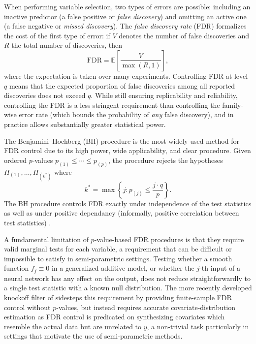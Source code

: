 When performing variable selection, two types of errors are
possible: 
including an inactive predictor (a false positive or \emph{false discovery}) 
and omitting an active one (a false negative or \emph{missed discovery}).
The \emph{false discovery rate} (FDR) formalizes the cost of the
first type of error: if $V$ denotes the number of false discoveries
and $R$ the total number of discoveries, then
\begin{equation}
  \mathrm{FDR} = \mathbb{E}\!\left[\frac{V}{\max(R, 1)}\right],
  \label{eq:fdr}
\end{equation}
where the expectation is taken over many experiments.
Controlling FDR at level $q$ means that the expected proportion of
false discoveries among all reported discoveries does not exceed
$q$. While still ensuring replicability and reliability, 
controlling the FDR is a less stringent requirement than controlling the
family-wise error rate (which bounds the probability of \emph{any}
false discovery), and in practice allows substantially greater
statistical power.

The Benjamini--Hochberg (BH) procedure \citep{benjamini1995fdr}
is the most widely used method for FDR control due to its high power, wide applicability, and clear procedure. Given ordered
$p$-values $p_{(1)} \leq \cdots \leq p_{(p)}$, the procedure
rejects the hypotheses $H_{(1)}, \ldots, H_{(k^*)}$ where
\begin{equation}
  k^* = \max\!\left\{j : p_{(j)} \leq \frac{j \cdot q}{p}\right\}.
  \label{eq:bh}
\end{equation}
The BH procedure controls FDR exactly under independence of the
test statistics as well as under positive dependancy (informally, positive correlation between test statistics) \citep{benjamini_control_2001}. 

A fundamental limitation of $p$-value-based FDR procedures is that
they require valid marginal tests for each variable, a requirement
that can be difficult or impossible to satisfy in semi-parametric
settings. Testing whether a smooth function $f_j \equiv 0$ in a
generalized additive model, or whether the $j$-th input of a neural
network has any effect on the output, does not reduce straightforwardly
to a single test statistic with a known null distribution. The more recently developed
knockoff filter of \citet{barber_controlling_2015} sidesteps this
requirement by providing finite-sample FDR control without $p$-values,
but instead requires accurate covariate-distribution estimation as FDR control is 
predicated on synthesizing covariates which resemble the actual data but are unrelated to $y$, 
a non-trivial task particularly in settings that motivate the use of semi-parametric methods.

